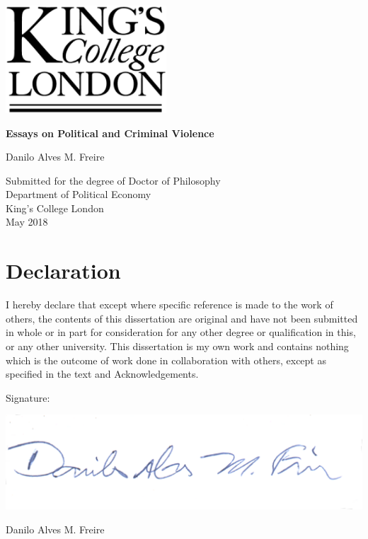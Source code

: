 \documentclass[a4paper,12pt]{report}
\begin{document}


\thispagestyle{empty}
\begin{center}
\includegraphics[width=6cm]{images/kcl.eps}
\end{center}	
\vskip40mm
\begin{center}

\huge\textbf{Essays on Political and Criminal Violence}
\vskip2mm
\vskip5mm

\Large Danilo Alves M. Freire
\normalsize
\vfill
\large

Submitted for the degree of Doctor of Philosophy \\
Department of Political Economy \\
King's College London	\\

May 2018
\end{center}	

\chapter*{Declaration}
\noindent 
I hereby declare that except where specific reference is made to the work of others, the contents of this dissertation are original and have not been submitted in whole or in part for consideration for any other degree or qualification in this, or any other university. This dissertation is my own work and contains nothing which is the outcome of work done in collaboration with others, except as specified in the text and Acknowledgements. 

\vskip20mm
\noindent
Signature:
\vskip10mm
\begin{flushleft}
\includegraphics[scale=.25]{images/sig.pdf}
\end{flushleft}
\noindent 
Danilo Alves M. Freire
\end{document}
